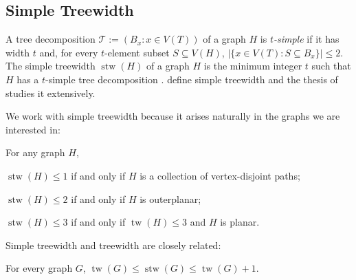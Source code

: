 \documentclass[kpfonts]{patmorin}
\DeclareMathOperator{\tw}{tw}
\DeclareMathOperator{\stw}{stw}
\theoremstyle{named}
\begin{document}
\subsection{Simple Treewidth}


A tree decomposition $\mathcal{T}:=(B_x:x\in V(T))$ of a graph $H$ is \emph{$t$-simple} if it has width $t$ and, for every $t$-element subset $S\subseteq V(H)$, $|\{x\in V(T):S\subseteq B_x\}|\le 2$.  The simple treewidth $\stw(H)$ of a graph $H$ is the minimum integer $t$ such that $H$ has a $t$-simple tree decomposition \cite{knauer.ueckerdt:simple}.  \citet{knauer.ueckerdt:simple} define simple treewidth and the thesis of \citet{wulf:stacked} studies it extensively.

%

We work with simple treewidth because it arises naturally in the graphs we are interested in:

\begin{lem}\label{simple-small-cases}
    For any graph $H$,
    \begin{compactenum}[(i)]
        \item $\stw(H)\le 1$ if and only if $H$ is a collection of vertex-disjoint paths;
        \item $\stw(H)\le 2$ if and only if $H$ is outerplanar;
        \item $\stw(H)\le 3$ if and only if $\tw(H)\le 3$ and $H$ is planar.
    \end{compactenum}
\end{lem}

Simple treewidth and treewidth are closely related:

\begin{lem}\label{simple-treewidth-vs-treewidth}
    For every graph $G$, $\tw(G)\le \stw(G)\le \tw(G)+1$.
\end{lem}
\end{document}
